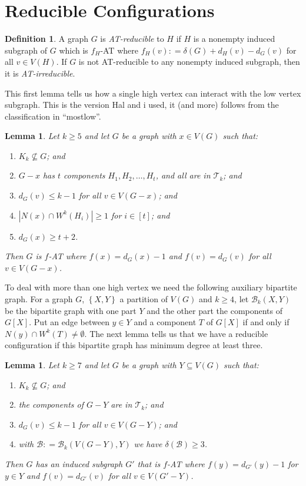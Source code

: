 \documentclass[12pt]{article}
\theoremstyle{plain}
\newtheorem{lem}[thm]{Lemma}
\theoremstyle{definition}
\newtheorem{defn}{Definition}
\theoremstyle{remark}
\newcommand{\fancy}[1]{\mathcal{#1}}
\newcommand{\T}{\fancy{T}}
\newcommand{\B}{\fancy{B}}
\newcommand{\set}[1]{\left\{ #1 \right\}}
\newcommand{\card}[1]{\left|#1\right|}
\newcommand{\irange}[1]{\left[#1\right]}
\newcommand{\DefinedAs}{\mathrel{\mathop:}=}
\begin{document}
\section{Reducible Configurations}
\begin{defn}
	A graph $G$ is \emph{AT-reducible} to $H$ if $H$ is a nonempty induced subgraph of $G$ which is $f_H$-AT where $f_H(v) \DefinedAs \delta(G) + d_H(v) - d_G(v)$ for all $v \in V(H)$.  
	If $G$ is not AT-reducible to any nonempty induced subgraph, then it is \emph{AT-irreducible}.
\end{defn}

This first lemma tells us how a single high vertex can interact with the low vertex subgraph.  This is the version Hal and i used, it (and more) follows from the classification in ``mostlow''.

\begin{lem}\label{ConfigurationTypeOneEuler}
Let $k \ge 5$ and let $G$ be a graph with $x \in V(G)$ such that:
\begin{enumerate}
\item $K_k \not \subseteq G$; and
\item $G-x$ has $t$ components $H_1, H_2, \ldots, H_t$, and all are in $\T_k$; and
\item $d_G(v) \leq k - 1$ for all $v \in V(G-x)$; and
\item $\card{N(x) \cap W^k(H_i)} \ge 1$ for $i \in \irange{t}$; and
\item $d_G(x) \ge t+2$.
\end{enumerate}

\noindent Then $G$ is $f$-AT where $f(x) = d_G(x) - 1$ and $f(v) = d_G(v)$ for all $v \in V(G - x)$.
\end{lem}

To deal with more than one high vertex we need the following auxiliary bipartite graph.  For a graph $G$, $\set{X, Y}$ a partition of $V(G)$ and $k \ge 4$, let $\B_k(X, Y)$ be the bipartite graph with one part $Y$ and the other part the components of $G[X]$.  Put an edge between $y \in Y$ and a component $T$ of $G[X]$ if and only if $N(y) \cap W^k(T) \ne \emptyset$.   The next lemma tells us that we have a reducible configuration if this bipartite graph has minimum degree at least three.  

\begin{lem}
	\label{MultipleHighConfigurationEuler} Let $k\ge7$ and let $G$ be a graph with
	$Y\subseteq V(G)$ such that: 
	\begin{enumerate}
		\item $K_{k}\not\subseteq G$; and 
		\item the components of $G-Y$ are in $\T_{k}$; and 
		\item $d_{G}(v)\leq k-1$ for all $v\in V(G-Y)$; and 
		\item with $\B\DefinedAs\B_{k}(V(G-Y),Y)$ we have $\delta(\B)\ge3$. 
	\end{enumerate}
	\noindent Then $G$ has an induced subgraph $G'$ that is $f$-AT where $f(y)=d_{G'}(y)-1$
	for $y\in Y$ and $f(v)=d_{G'}(v)$ for all $v\in V(G'-Y)$.\end{lem}
\end{document}
